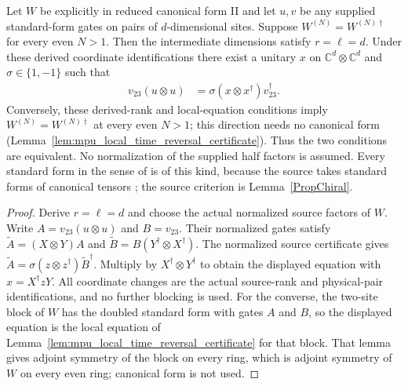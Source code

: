 \begin{lemma}
    \label{lem:mpu_supplied_forward_local_time_reversal}
    \leanok
    Let $W$ be explicitly in reduced canonical form II and let $u,v$
    be any supplied standard-form gates on pairs of $d$-dimensional sites.
    Suppose $W^{(N)}=W^{(N)\dagger}$ for every even $N>1$.
    Then the intermediate dimensions satisfy $r=\ell=d$.
    Under these derived coordinate identifications there exist a unitary
    $x$ on $\mathbb C^d\otimes\mathbb C^d$ and $\sigma\in\{1,-1\}$ such that
    \begin{align}
        v_{23}(u\otimes u) & =\sigma(x\otimes x^\dagger)v_{23}^\dagger.
    \end{align}
    Conversely, these derived-rank and local-equation conditions imply
    $W^{(N)}=W^{(N)\dagger}$ at every even $N>1$; this direction needs no
    canonical form (Lemma~\ref{lem:mpu_local_time_reversal_certificate}).
    Thus the two conditions are equivalent. No normalization of the supplied
    half factors is assumed. Every standard form in the sense of
    \cite[Definition~III.9]{Cirac2017MPU} is of this kind, because the source
    takes standard forms of canonical tensors
    \cite{gap:mpu_standard_form_canonical_convention}; the source criterion
    \cite[lines~1201--1252]{Cirac2017MPU} is Lemma~\ref{PropChiral}.
\end{lemma}

\begin{proof}\leanok
    Derive $r=\ell=d$ and choose the actual normalized source factors of $W$.
    Write $A=v_{23}(u\otimes u)$ and $B=v_{23}$.
    Their normalized gates satisfy
    $\widetilde A=(X\otimes Y)A$ and
    $\widetilde B=B(Y^\dagger\otimes X^\dagger)$.
    The normalized source certificate gives
    $\widetilde A=\sigma(z\otimes z^\dagger)\widetilde B^\dagger$.
    Multiply by $X^\dagger\otimes Y^\dagger$ to obtain the displayed equation
    with $x=X^\dagger zY$. All coordinate changes are the actual source-rank
    and physical-pair identifications, and no further blocking is used.
    For the converse, the two-site block of $W$ has the doubled standard
    form with gates $A$ and $B$, so the displayed equation is the local
    equation of Lemma~\ref{lem:mpu_local_time_reversal_certificate} for
    that block. That lemma gives adjoint symmetry of the block on every ring,
    which is adjoint symmetry of $W$ on every even ring; canonical form is
    not used.
\end{proof}

